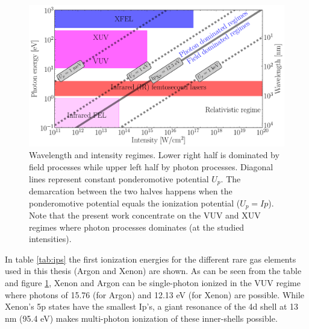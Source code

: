 \begin{figure}
\centering
\includegraphics[width=\figurewidth]{figures/regimes}
\caption{Wavelength and intensity regimes. Lower right half is dominated
         by field processes while upper left half by photon processes. Diagonal
         lines represent constant ponderomotive potential $U_p$. The
         demarcation between the two halves happens when the ponderomotive
         potential equals the ionization potential ($U_p = Ip$).
         Note that the present work concentrate on the VUV and XUV regimes
         where photon processes dominates (at the studied intensities).}
\label{fig:regimes}
\end{figure}

In table \ref{tab:ips} the first ionization energies for the different
rare gas elements used in this thesis (Argon and Xenon) are shown. As can be
seen from the table and figure \ref{fig:regimes}, Xenon and Argon can be
single-photon ionized in the VUV regime where photons of 15.76 (for Argon)
and 12.13 eV (for Xenon) are possible. While Xenon's 5p states have the smallest
Ip's, a giant resonance of the 4d shell at 13 nm (95.4 eV) makes multi-photon
ionization of these inner-shells possible.

